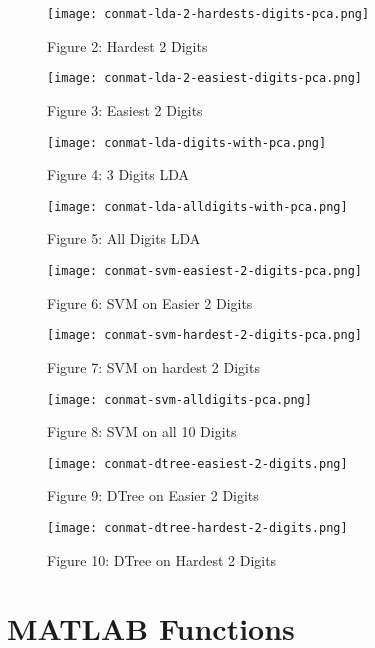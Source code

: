 \documentclass{article}
\begin{document}
\begin{appendices}
    \begin{figure}[h]
        \texttt{[image: conmat-lda-2-hardests-digits-pca.png]}
        \caption{Figure 2: Hardest 2 Digits}\label{fig:figure2}
        \texttt{[image: conmat-lda-2-easiest-digits-pca.png]}
        \caption{Figure 3: Easiest 2 Digits} \label{fig:figure3}
        \texttt{[image: conmat-lda-digits-with-pca.png]}
        \caption{Figure 4: 3 Digits LDA}\label{fig:figure4}
        \texttt{[image: conmat-lda-alldigits-with-pca.png]}
        \caption{Figure 5: All Digits LDA}\label{fig:figure5}
        \label{fig:fig2}
    \end{figure}
    \begin{figure}[h]
        \texttt{[image: conmat-svm-easiest-2-digits-pca.png]}
        \caption{Figure 6: SVM on Easier 2 Digits}\label{fig:figure6}
        \texttt{[image: conmat-svm-hardest-2-digits-pca.png]}
        \caption{Figure 7: SVM on hardest 2 Digits}\label{fig:figure7}
        \texttt{[image: conmat-svm-alldigits-pca.png]}
        \caption{Figure 8: SVM on all 10 Digits}\label{fig:figure8}
        \label{fig:fig3}
    \end{figure}
    \begin{figure}[h]
        \texttt{[image: conmat-dtree-easiest-2-digits.png]}
        \caption{Figure 9: DTree on Easier 2 Digits}\label{fig:figure9}
        \texttt{[image: conmat-dtree-hardest-2-digits.png]}
        \caption{Figure 10: DTree on Hardest 2 Digits}\label{fig:figure10}
    \end{figure}

\section{MATLAB Functions}

\end{appendices}
\end{document}
